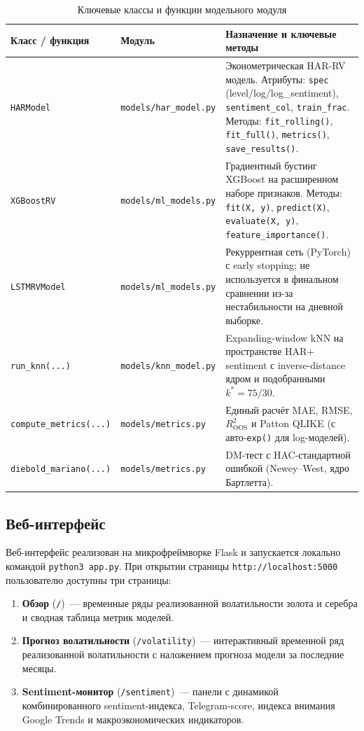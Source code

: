 \begin{table}[h!]
\centering
\caption{Ключевые классы и функции модельного модуля}
\label{tab:classes}
\small
\begin{tabular}{p{3.4cm}p{4.0cm}p{6.5cm}}
\hline
Класс / функция & Модуль & Назначение и ключевые методы \\
\hline
\texttt{HARModel}
  & \texttt{models/har\_model.py}
  & Эконометрическая HAR-RV модель.
    Атрибуты: \texttt{spec} (level/log/log\_sentiment),
    \texttt{sentiment\_col}, \texttt{train\_frac}.
    Методы: \texttt{fit\_rolling()},
    \texttt{fit\_full()},
    \texttt{metrics()},
    \texttt{save\_results()}. \\
\texttt{XGBoostRV}
  & \texttt{models/ml\_models.py}
  & Градиентный бустинг XGBoost
    на расширенном наборе признаков.
    Методы: \texttt{fit(X, y)},
    \texttt{predict(X)},
    \texttt{evaluate(X, y)},
    \texttt{feature\_importance()}. \\
\texttt{LSTMRVModel}
  & \texttt{models/ml\_models.py}
  & Рекуррентная сеть (PyTorch) с early stopping;
    не используется в финальном сравнении из-за
    нестабильности на дневной выборке. \\
\texttt{run\_knn(...)}
  & \texttt{models/knn\_model.py}
  & Expanding-window kNN на пространстве
    HAR$+$sentiment с inverse-distance ядром
    и подобранными $k^*=75/30$. \\
\texttt{compute\_metrics(...)}
  & \texttt{models/metrics.py}
  & Единый расчёт MAE, RMSE, $R^2_{\mathrm{OOS}}$
    и Patton QLIKE (с авто-\texttt{exp()} для log-моделей). \\
\texttt{diebold\_mariano(...)}
  & \texttt{models/metrics.py}
  & DM-тест с HAC-стандартной ошибкой
    (Newey--West, ядро Бартлетта). \\
\hline
\end{tabular}
\end{table}

\subsection{Веб-интерфейс}

Веб-интерфейс реализован на микрофреймворке Flask и запускается
локально командой \texttt{python3 app.py}.
При открытии страницы \texttt{http://localhost:5000} пользователю
доступны три страницы:

\begin{enumerate}
    \item \textbf{Обзор} (\texttt{/})~--- временные ряды реализованной
          волатильности золота и серебра и сводная таблица метрик моделей.
    \item \textbf{Прогноз волатильности} (\texttt{/volatility})~---
          интерактивный временной ряд реализованной волатильности
          с наложением прогноза модели за последние месяцы.
    \item \textbf{Sentiment-монитор} (\texttt{/sentiment})~---
          панели с динамикой комбинированного sentiment-индекса,
          Telegram-score, индекса внимания Google Trends и
          макроэкономических индикаторов.
\end{enumerate}

